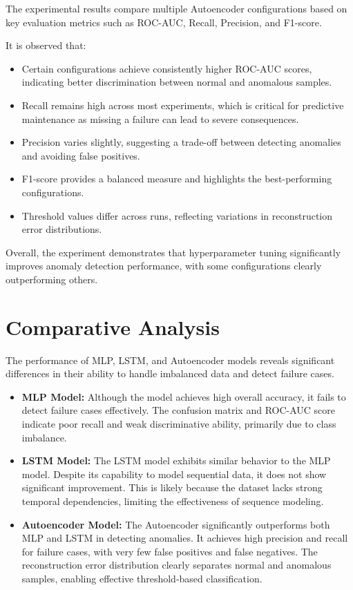 \documentclass{ecsproject}     %
\begin{document}
The experimental results compare multiple Autoencoder configurations based on key evaluation metrics such as ROC-AUC, Recall, Precision, and F1-score.

It is observed that:

\begin{itemize}
    \item Certain configurations achieve consistently higher ROC-AUC scores, indicating better discrimination between normal and anomalous samples.
    
    \item Recall remains high across most experiments, which is critical for predictive maintenance as missing a failure can lead to severe consequences.
    
    \item Precision varies slightly, suggesting a trade-off between detecting anomalies and avoiding false positives.
    
    \item F1-score provides a balanced measure and highlights the best-performing configurations.
    
    \item Threshold values differ across runs, reflecting variations in reconstruction error distributions.
\end{itemize}

Overall, the experiment demonstrates that hyperparameter tuning significantly improves anomaly detection performance, with some configurations clearly outperforming others.

\section{Comparative Analysis}

The performance of MLP, LSTM, and Autoencoder models reveals significant differences in their ability to handle imbalanced data and detect failure cases.

\begin{itemize}
    \item \textbf{MLP Model:} Although the model achieves high overall accuracy, it fails to detect failure cases effectively. The confusion matrix and ROC-AUC score indicate poor recall and weak discriminative ability, primarily due to class imbalance.

    \item \textbf{LSTM Model:} The LSTM model exhibits similar behavior to the MLP model. Despite its capability to model sequential data, it does not show significant improvement. This is likely because the dataset lacks strong temporal dependencies, limiting the effectiveness of sequence modeling.

    \item \textbf{Autoencoder Model:} The Autoencoder significantly outperforms both MLP and LSTM in detecting anomalies. It achieves high precision and recall for failure cases, with very few false positives and false negatives. The reconstruction error distribution clearly separates normal and anomalous samples, enabling effective threshold-based classification.
\end{itemize}
\end{document}
